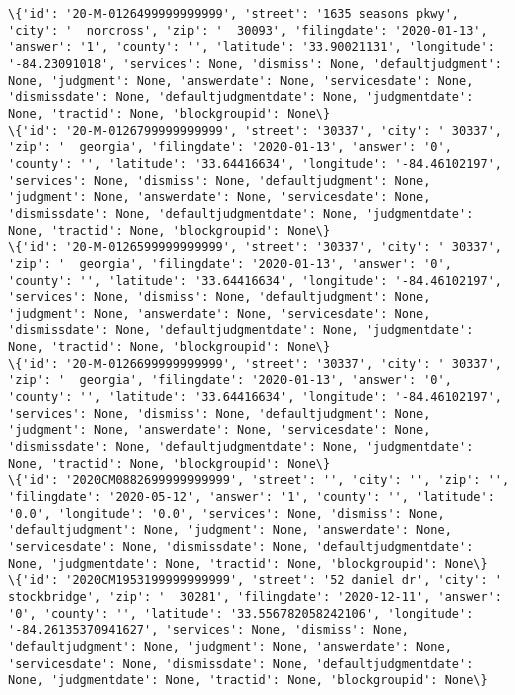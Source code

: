 \documentclass[11pt]{article}
\begin{document}
\begin{Verbatim}[commandchars=\\\{\}]
\{'id': '20-M-0126499999999999', 'street': '1635 seasons pkwy', 'city': '  norcross', 'zip': '  30093', 'filingdate': '2020-01-13', 'answer': '1', 'county': '', 'latitude': '33.90021131', 'longitude': '-84.23091018', 'services': None, 'dismiss': None, 'defaultjudgment': None, 'judgment': None, 'answerdate': None, 'servicesdate': None, 'dismissdate': None, 'defaultjudgmentdate': None, 'judgmentdate': None, 'tractid': None, 'blockgroupid': None\}
\{'id': '20-M-0126799999999999', 'street': '30337', 'city': ' 30337', 'zip': '  georgia', 'filingdate': '2020-01-13', 'answer': '0', 'county': '', 'latitude': '33.64416634', 'longitude': '-84.46102197', 'services': None, 'dismiss': None, 'defaultjudgment': None, 'judgment': None, 'answerdate': None, 'servicesdate': None, 'dismissdate': None, 'defaultjudgmentdate': None, 'judgmentdate': None, 'tractid': None, 'blockgroupid': None\}
\{'id': '20-M-0126599999999999', 'street': '30337', 'city': ' 30337', 'zip': '  georgia', 'filingdate': '2020-01-13', 'answer': '0', 'county': '', 'latitude': '33.64416634', 'longitude': '-84.46102197', 'services': None, 'dismiss': None, 'defaultjudgment': None, 'judgment': None, 'answerdate': None, 'servicesdate': None, 'dismissdate': None, 'defaultjudgmentdate': None, 'judgmentdate': None, 'tractid': None, 'blockgroupid': None\}
\{'id': '20-M-0126699999999999', 'street': '30337', 'city': ' 30337', 'zip': '  georgia', 'filingdate': '2020-01-13', 'answer': '0', 'county': '', 'latitude': '33.64416634', 'longitude': '-84.46102197', 'services': None, 'dismiss': None, 'defaultjudgment': None, 'judgment': None, 'answerdate': None, 'servicesdate': None, 'dismissdate': None, 'defaultjudgmentdate': None, 'judgmentdate': None, 'tractid': None, 'blockgroupid': None\}
\{'id': '2020CM0882699999999999', 'street': '', 'city': '', 'zip': '', 'filingdate': '2020-05-12', 'answer': '1', 'county': '', 'latitude': '0.0', 'longitude': '0.0', 'services': None, 'dismiss': None, 'defaultjudgment': None, 'judgment': None, 'answerdate': None, 'servicesdate': None, 'dismissdate': None, 'defaultjudgmentdate': None, 'judgmentdate': None, 'tractid': None, 'blockgroupid': None\}
\{'id': '2020CM1953199999999999', 'street': '52 daniel dr', 'city': '  stockbridge', 'zip': '  30281', 'filingdate': '2020-12-11', 'answer': '0', 'county': '', 'latitude': '33.556782058242106', 'longitude': '-84.26135370941627', 'services': None, 'dismiss': None, 'defaultjudgment': None, 'judgment': None, 'answerdate': None, 'servicesdate': None, 'dismissdate': None, 'defaultjudgmentdate': None, 'judgmentdate': None, 'tractid': None, 'blockgroupid': None\}

\end{Verbatim}
\end{document}
